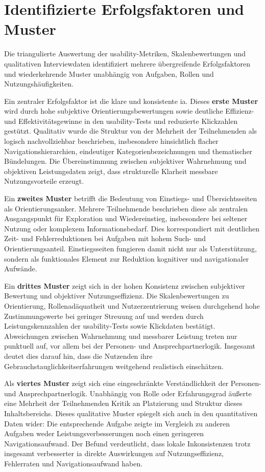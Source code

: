 \section{Identifizierte Erfolgsfaktoren und Muster}
\label{sec:05-04_success-factors}

Die triangulierte Auswertung der \Gls{usability}-Metriken, Skalenbewertungen und qualitativen Interviewdaten identifiziert mehrere übergreifende Erfolgsfaktoren und wiederkehrende Muster unabhängig von Aufgaben, Rollen und Nutzungshäufigkeiten.

Ein zentraler Erfolgsfaktor ist die klare und konsistente \Gls{ia}. Dieses \textbf{erste Muster} wird durch hohe subjektive Orientierungsbewertungen sowie deutliche Effizienz- und Effektivitätsgewinne in den \Gls{usability}-Tests und reduzierte Klickzahlen gestützt. Qualitativ wurde die Struktur von der Mehrheit der Teilnehmenden als logisch nachvollziehbar beschrieben, insbesondere hinsichtlich flacher Navigationshierarchien, eindeutiger Kategorienbezeichnungen und thematischer Bündelungen. Die Übereinstimmung zwischen subjektiver Wahrnehmung und objektiven Leistungsdaten zeigt, dass strukturelle Klarheit messbare Nutzungsvorteile erzeugt.

Ein \textbf{zweites Muster} betrifft die Bedeutung von Einstiegs- und Übersichtsseiten als Orientierungsanker. Mehrere Teilnehmende beschrieben diese als zentralen Ausgangspunkt für Exploration und Wiedereinstieg, insbesondere bei seltener Nutzung oder komplexem Informationsbedarf. Dies korrespondiert mit deutlichen Zeit- und Fehlerreduktionen bei Aufgaben mit hohem Such- und Orientierungsanteil. Einstiegsseiten fungieren damit nicht nur als Unterstützung, sondern als funktionales Element zur Reduktion kognitiver und navigationaler Aufwände.

Ein \textbf{drittes Muster} zeigt sich in der hohen Konsistenz zwischen subjektiver Bewertung und objektiver Nutzungseffizienz. Die Skalenbewertungen zu Orientierung, Rollenadäquatheit und Nutzerzentrierung weisen durchgehend hohe Zustimmungswerte bei geringer Streuung auf und werden durch Leistungskennzahlen der \Gls{usability}-Tests sowie Klickdaten bestätigt. Abweichungen zwischen Wahrnehmung und messbarer Leistung treten nur punktuell auf, vor allem bei der Personen- und Ansprechpartnerlogik. Insgesamt deutet dies darauf hin, dass die Nutzenden ihre Gebrauchstauglichkeitserfahrungen weitgehend realistisch einschätzen.

Als \textbf{viertes Muster} zeigt sich eine eingeschränkte Verständlichkeit der Personen- und Ansprechpartnerlogik. Unabhängig von Rolle oder Erfahrungsgrad äußerte eine Mehrheit der Teilnehmenden Kritik an Platzierung und Struktur dieses Inhaltsbereichs. Dieses qualitative Muster spiegelt sich auch in den quantitativen Daten wider: Die entsprechende Aufgabe zeigte im Vergleich zu anderen Aufgaben weder Leistungsverbesserungen noch einen geringeren Navigationsaufwand. Der Befund verdeutlicht, dass lokale Inkonsistenzen trotz insgesamt verbesserter \Gls{ia} direkte Auswirkungen auf Nutzungseffizienz, Fehlerraten und Navigationsaufwand haben.

